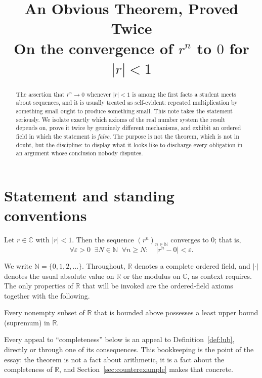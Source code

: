 \documentclass{essay}
\title{An Obvious Theorem, Proved Twice\\[2pt]
\large On the convergence of \(r^{n}\) to \(0\) for \(|r| < 1\)}
\author{}
\date{}
\begin{document}
\maketitle

\begin{abstract}
  \noindent
  The assertion that \(r^{n} \to 0\) whenever \(|r| < 1\) is among the first facts a
  student meets about sequences, and it is usually treated as self-evident: repeated
  multiplication by something small ought to produce something small. This note takes
  the statement seriously. We isolate exactly which axioms of the real number system
  the result depends on, prove it twice by genuinely different mechanisms, and exhibit
  an ordered field in which the statement is \emph{false}. The purpose is not the
  theorem, which is not in doubt, but the discipline: to display what it looks like to
  discharge every obligation in an argument whose conclusion nobody disputes.
\end{abstract}

\tableofcontents

\section{Statement and standing conventions}

\begin{theorem}\label{thm:main}
  Let \(r \in \mathbb{C}\) with \(|r| < 1\). Then the sequence \((r^{n})_{n \in \mathbb{N}}\)
  converges to \(0\); that is,
  \[ \forall \varepsilon > 0 \;\; \exists N \in \mathbb{N} \;\; \forall n \geq N : \quad |r^{n} - 0| < \varepsilon . \]
\end{theorem}

We write \(\mathbb{N} = \{0, 1, 2, \dots\}\). Throughout, \(\mathbb{R}\) denotes a complete
ordered field, and \(|\cdot|\) denotes the usual absolute value on \(\mathbb{R}\) or the
modulus on \(\mathbb{C}\), as context requires. The only properties of \(\mathbb{R}\) that
will be invoked are the ordered-field axioms together with the following.

\begin{definition}\label{def:lub}
  Every nonempty subset of \(\mathbb{R}\) that is bounded above possesses a least upper
  bound (supremum) in \(\mathbb{R}\).
\end{definition}

Every appeal to ``completeness'' below is an appeal to Definition~\ref{def:lub},
directly or through one of its consequences. This bookkeeping is the point of the
essay: the theorem is not a fact about arithmetic, it is a fact about the
completeness of \(\mathbb{R}\), and Section~\ref{sec:counterexample} makes that
concrete.
\end{document}
